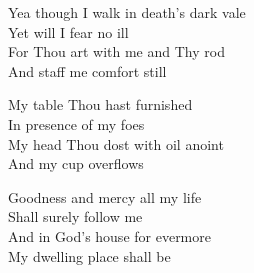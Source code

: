 \documentclass[aspectratio=169]{beamer}
\begin{document}
{\begin{frame}{}
\end{frame}
\hypertarget{The Lord's my Shepherd['Psalm 23'](Trad)3}{}
\begin{frame}{}
\fontsize{23.68421052631579}{28.42105263157895}\selectfont

Yea though I walk in death's dark vale\\ 
Yet will I fear no ill\\ 
For Thou art with me and Thy rod\\ 
And staff me comfort still

\end{frame}
\hypertarget{The Lord's my Shepherd['Psalm 23'](Trad)4}{}
\begin{frame}{}
\fontsize{23.68421052631579}{28.42105263157895}\selectfont

My table Thou hast furnished\\ 
In presence of my foes\\ 
My head Thou dost with oil anoint\\ 
And my cup overflows

\end{frame}
\hypertarget{The Lord's my Shepherd['Psalm 23'](Trad)5}{}
\begin{frame}{}
\fontsize{23.68421052631579}{28.42105263157895}\selectfont

Goodness and mercy all my life\\ 
Shall surely follow me\\ 
And in God's house for evermore\\ 
My dwelling place shall be

\end{frame}
}
\end{document}
